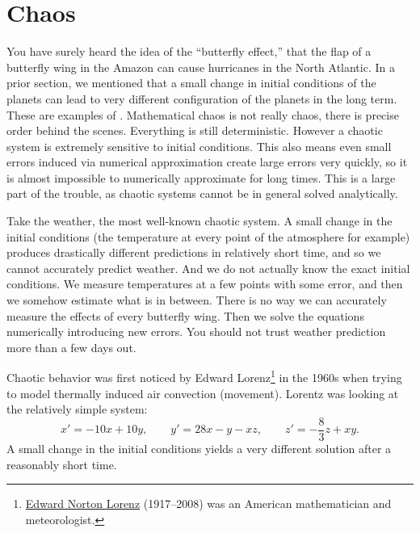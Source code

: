 \section{Chaos} \label{sec:chaos}



You have surely heard the idea of the ``butterfly effect,'' that the
flap of a butterfly wing in the Amazon can cause hurricanes in the North
Atlantic.  In a prior section, we mentioned that a small change in
initial conditions of the planets can lead to very different configuration
of the planets in the long term.  These are examples of
\emph{}.
Mathematical chaos is not really chaos, there is precise order behind the
scenes.  Everything is still deterministic.  However a chaotic system is extremely
sensitive to initial conditions.  This also means even small errors induced 
via numerical approximation create large errors very quickly, so it is
almost impossible to numerically approximate for long times.
This is a large part of
the trouble, as chaotic systems cannot be in general solved analytically.

Take the weather, the most well-known chaotic system.
A small change in the initial conditions
(the temperature at every point of the atmosphere for example) produces
drastically different predictions in relatively short time, and so we cannot
accurately predict weather.  And we do not actually know the
exact initial conditions.  We measure temperatures at a few points with some
error, and then we somehow estimate what is in between.
There is no way we
can accurately measure the effects of every butterfly wing.
Then
we solve the equations numerically introducing new errors.  You
should not trust weather prediction more than a few days out.

Chaotic behavior was first noticed by Edward
Lorenz\footnote{\href{https://en.wikipedia.org/wiki/Edward_Norton_Lorenz}{Edward Norton Lorenz} (1917--2008) was
an American mathematician and meteorologist.}
in the
1960s when trying to model thermally induced air convection (movement).
Lorentz was looking at the relatively simple system:
\begin{equation*}
x' = -10x +10y, \qquad y' = 28x-y-xz, \qquad z'=-\frac{8}{3}z + xy .
\end{equation*}
A small change in the initial conditions yields a very different solution
after a reasonably short time.

